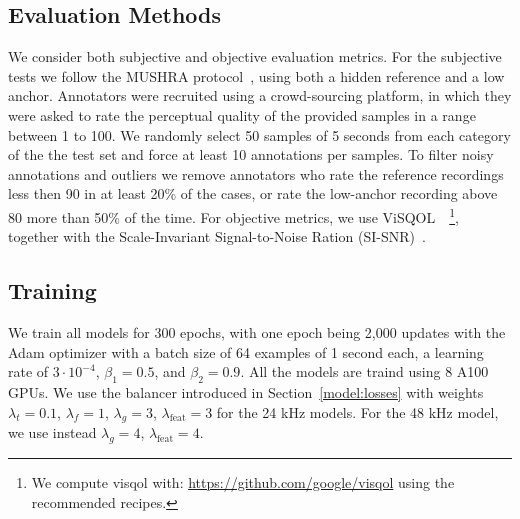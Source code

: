 

\subsection{Evaluation Methods}
\label{eval_methods}
We consider both subjective and objective evaluation metrics. For the subjective tests we follow the MUSHRA protocol~\citep{series2014method}, using both a hidden reference and a low anchor. Annotators were recruited using a crowd-sourcing platform, in which they were asked to rate the perceptual quality of the provided samples in a range between 1 to 100. We randomly select 50 samples of 5 seconds from each category of the the test set and force at least 10 annotations per samples. To filter noisy annotations and outliers we remove annotators who rate the reference recordings less then 90 in at least 20\% of the cases, or rate the low-anchor recording above 80 more than 50\% of the time. 
For objective metrics, we use ViSQOL~\citep{hines2012visqol,chinen2020visqol}~\footnote{We compute visqol with: \url{https://github.com/google/visqol} using the recommended recipes.}, together with the Scale-Invariant Signal-to-Noise Ration (SI-SNR)~\citep{luo2019conv, nachmani2020voice, chazan2021single}. 

\subsection{Training}
\label{training}

We train all models for 300 epochs, with one epoch being 2,000 updates with the Adam optimizer with a batch size of 64 examples of 1 second each, a learning rate of $3\cdot 10^{-4}$, $\beta_1=0.5$, and $\beta_2=0.9$. 
All the models are traind using 8 A100 GPUs. We use the balancer introduced in Section~\ref{model:losses}
with weights
$\lambda_t = 0.1$, $\lambda_f = 1$, $\lambda_g=3$, $\lambda_\mathrm{feat} = 3$ for the 24 kHz models.
For the 48 kHz model, we use instead $\lambda_g=4$, $\lambda_\mathrm{feat} = 4$.



